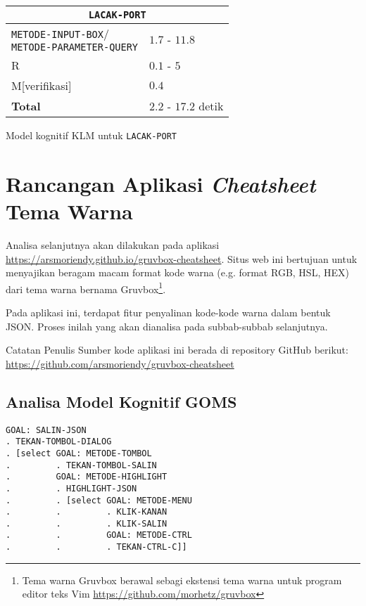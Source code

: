 \begin{chtbl}
  \begin{tabularx}{\columnwidth}{lX}
    \hline
    \multicolumn{2}{c}{\textbf{\texttt{LACAK-PORT}}} \\
    \hline

    \makecell{\texttt{METODE-INPUT-BOX}/\\\texttt{METODE-PARAMETER-QUERY}}
    & $1.7$ - $11.8$ \\
    R & $0.1$ - $5$ \\
    M[verifikasi] & $0.4$ \\

    \hline
    \textbf{Total} & $2.2$ - $17.2$ detik \\
    \hline
  \end{tabularx}
  \caption{Model kognitif KLM untuk \texttt{LACAK-PORT}}
\end{chtbl}

\section{Rancangan Aplikasi \textit{Cheatsheet} Tema Warna}

Analisa selanjutnya akan dilakukan pada aplikasi
\url{https://arsmoriendy.github.io/gruvbox-cheatsheet}. Situs web
ini bertujuan untuk menyajikan beragam macam format kode warna (e.g.
format RGB, HSL, HEX) dari tema warna bernama Gruvbox\footnote{
  Tema warna Gruvbox berawal sebagi ekstensi tema warna untuk
  program editor teks Vim \url{https://github.com/morhetz/gruvbox}
}.


Pada aplikasi ini, terdapat fitur penyalinan kode-kode warna dalam
bentuk JSON. Proses inilah yang akan dianalisa pada subbab-subbab selanjutnya.

\begin{info}{Catatan Penulis}
  Sumber kode aplikasi ini berada di repository GitHub berikut:
  \url{https://github.com/arsmoriendy/gruvbox-cheatsheet}
\end{info}

\clearpage
\subsection{Analisa Model Kognitif GOMS}

\begin{verbatim}
GOAL: SALIN-JSON
. TEKAN-TOMBOL-DIALOG
. [select GOAL: METODE-TOMBOL
.         . TEKAN-TOMBOL-SALIN
.         GOAL: METODE-HIGHLIGHT
.         . HIGHLIGHT-JSON
.         . [select GOAL: METODE-MENU
.         .         . KLIK-KANAN
.         .         . KLIK-SALIN
.         .         GOAL: METODE-CTRL
.         .         . TEKAN-CTRL-C]]
\end{verbatim}

